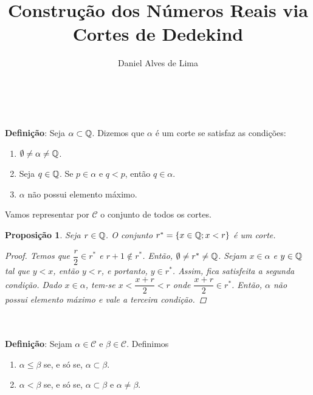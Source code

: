 \documentclass[a4paper,12pt]{article}
\title{\textbf {Construção dos Números Reais via Cortes de Dedekind}}
\author[1]{Daniel Alves de Lima}
\date{}
\newtheorem*{p1}{Proposição}
\begin{document}
	
\maketitle

\\\\
\textbf{Definição}: Seja $\alpha \subset \Bbb Q$. Dizemos que $\alpha$ é um corte se satisfaz as condições:

\begin{enumerate}
	
	\item $\emptyset \neq \alpha \neq \Bbb Q$.
	\item Seja $q \in \Bbb Q$. Se $p \in \alpha$ e $q < p$, então $q \in \alpha$.
	\item $\alpha$ não possui elemento máximo.
	
\end{enumerate}

\noindent Vamos representar por $\mathcal C$ o conjunto de todos os cortes.

\begin{p1}
	Seja $r \in \Bbb Q$. O conjunto $r^* = \{x \in \Bbb Q; x < r\}$ é um corte.
	
	\begin{proof}
		
		Temos que $\dfrac{r}{2} \in r^*$ e $r+1 \notin r^*$. Então, $\emptyset \neq r^* \neq \Bbb Q$. Sejam $x \in \alpha$ e $y \in \Bbb Q$ tal que $y < x$, então $y < r$, e portanto, $y \in r^*$. Assim, fica satisfeita a segunda condição. Dado $x \in \alpha$, tem-se $x < \dfrac{x+r}{2} < r$ onde $\dfrac{x+r}{2} \in r^*$. Então, $\alpha$ não possui elemento máximo e vale a terceira condição.  
		
	\end{proof}
	
\end{p1}

\\\\
\textbf{Definição}: Sejam $\alpha \in \mathcal C$ e $\beta \in \mathcal C$. Definimos

	\begin{enumerate}
		
		\item $\alpha \leq \beta$ se, e só se, $\alpha \subset \beta$.
		\item $\alpha < \beta$ se, e só se, $\alpha \subset \beta$ e $\alpha \neq \beta$.
	
	\end{enumerate}
\end{document}
